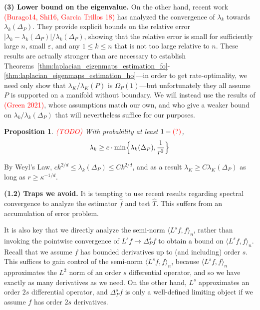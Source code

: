 \documentclass{article}
\newcommand{\1}{\mathbf{1}}
\newcommand{\Leb}{L}
\newcommand{\dotp}[2]{\langle #1, #2 \rangle}
\newcommand{\wh}[1]{\widehat{#1}}
\theoremstyle{alden}
\theoremstyle{aldenthm}
\newtheorem{proposition}{Proposition}
\theoremstyle{definition}
\theoremstyle{remark}
\begin{document}
\textbf{(3) Lower bound on the eigenvalue.} On the other hand, recent work \textcolor{red}{(Burago14, Shi16, Garcia Trillos 18)} has analyzed the convergence of $\lambda_{k}$ towards $\lambda_{k}(\Delta_P)$. They provide explicit bounds on the relative error $|\lambda_{k} - \lambda_{k}(\Delta_P)|/\lambda_{k}(\Delta_P)$, showing that the relative error is small for sufficiently large $n$, small $\varepsilon$, and any $1 \leq k \leq n$ that is not too large relative to $n$. These results are actually stronger than are necessary to establish Theorems~\ref{thm:laplacian_eigenmaps_estimation_fo}-\ref{thm:laplacian_eigenmaps_estimation_ho}---in order to get rate-optimality, we need only show that $\lambda_{K}/\lambda_K(P)$ is $\Omega_P(1)$---but unfortunately they all assume $P$ is supported on a manifold without boundary. We will instead use the results of \textcolor{red}{(Green 2021)}, whose assumptions match our own, and who give a weaker bound on $\lambda_k/\lambda_k(\Delta_P)$ that will nevertheless suffice for our purposes. 

\begin{proposition}
	\textcolor{red}{(TODO)}
	With probability at least $1 - \textcolor{red}{(?)}$,
	\begin{equation*}
	\lambda_k \geq c \cdot \min\Bigl\{\lambda_k(\Delta_P), \frac{1}{r^{2}} \Bigr\}
	\end{equation*}
\end{proposition}
By Weyl's Law, $c k^{2/d} \leq \lambda_{k}(\Delta_P) \leq Ck^{2/d}$, and as a result $\lambda_{K} \geq C\lambda_{K}(\Delta_P)$ as long as $r \geq \kappa^{-1/d}$. 

\textbf{(1.2) Traps we avoid.} It is tempting to use recent results regarding spectral convergence to analyze the estimator $\wh{f}$ and test $\wh{T}$. This suffers from an accumulation of error problem. 

It is also key that we directly analyze the semi-norm $\dotp{L^s f}{f}_n$, rather than invoking the pointwise convergence of $L^{s}f \to \Delta_P^{s}f$ to obtain a bound on $\dotp{L^s f}{f}_n$. Recall that we assume $f$ has bounded derivatives up to (and including) order $s$. This suffices to gain control of the semi-norm $\dotp{L^s f}{f}_n$, because $\dotp{L^s f}{f}_n$ approximates the $\Leb^2$ norm of an order $s$ differential operator, and so we have exactly as many derivatives as we need. On the other hand, $L^s$ approximates an order $2s$ differential operator, and $\Delta_P^sf$ is only a well-defined limiting object if we assume $f$ has order $2s$ derivatives. 
\end{document}
